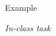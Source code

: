 \documentclass[11pt,compress,t,notes=noshow, aspectratio=169, xcolor=table]{beamer}
\begin{document}
\begin{frame}{Example}

\textit{In-class task}



    


    
\end{frame}
\end{document}
